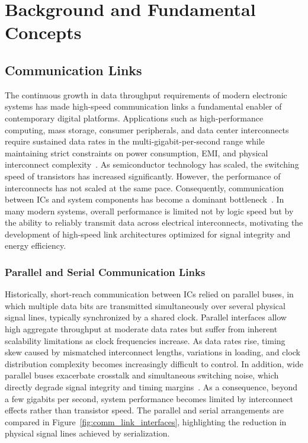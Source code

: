 \chapter{Background and Fundamental Concepts} \label{chap:ch2}

\section{Communication Links} \label{sec:bg_communication_links}

The continuous growth in data throughput requirements of modern electronic systems has made high-speed communication links a fundamental enabler of contemporary digital platforms. Applications such as high-performance computing, mass storage, consumer peripherals, and data center interconnects require sustained data rates in the multi-gigabit-per-second range while maintaining strict constraints on power consumption, \ac{EMI}, and physical interconnect complexity~\cite{baker, razavi}. As semiconductor technology has scaled, the switching speed of transistors has increased significantly. However, the performance of interconnects has not scaled at the same pace. Consequently, communication between \acp{IC} and system components has become a dominant bottleneck~\cite{dally_poulton_1998,yang_serial_links_1998}. In many modern systems, overall performance is limited not by logic speed but by the ability to reliably transmit data across electrical interconnects, motivating the development of high-speed link architectures optimized for signal integrity and energy efficiency.

\subsection{Parallel and Serial Communication Links}

Historically, short-reach communication between \acsp{IC} relied on parallel buses, in which multiple data bits are transmitted simultaneously over several physical signal lines, typically synchronized by a shared clock. Parallel interfaces allow high aggregate throughput at moderate data rates but suffer from inherent scalability limitations as clock frequencies increase. As data rates rise, timing skew caused by mismatched interconnect lengths, variations in loading, and clock distribution complexity becomes increasingly difficult to control. In addition, wide parallel buses exacerbate crosstalk and simultaneous switching noise, which directly degrade signal integrity and timing margins~\cite{palermo_IO, dally_poulton_1998}. As a consequence, beyond a few gigabits per second, system performance becomes limited by interconnect effects rather than transistor speed.
The parallel and serial arrangements are compared in Figure~\ref{fig:comm_link_interfaces}, highlighting the reduction in physical signal lines achieved by serialization.

